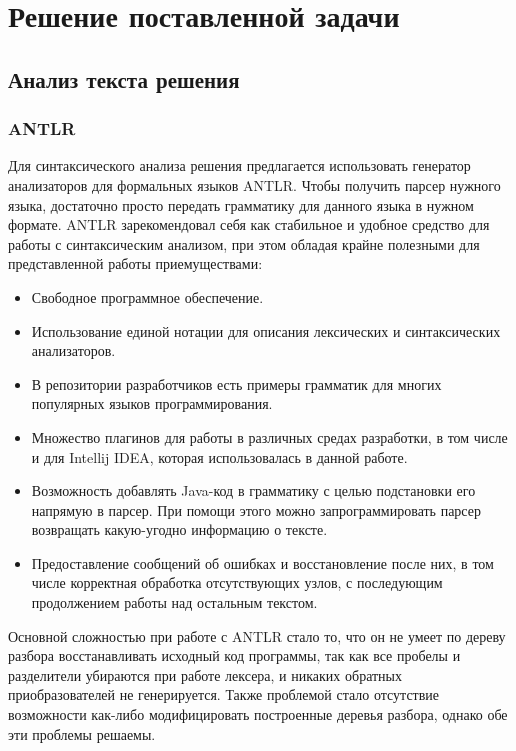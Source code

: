 \chapter{Решение поставленной задачи}

\section{Анализ текста решения}

\subsection{ANTLR}
Для синтаксического анализа решения предлагается использовать генератор анализаторов для формальных языков ANTLR.
Чтобы получить парсер нужного языка, достаточно просто передать грамматику для данного языка в нужном формате.
ANTLR зарекомендовал себя как стабильное и удобное средство для работы с синтаксическим анализом, при этом
обладая крайне полезными для представленной работы приемуществами:
\begin{itemize}
    \item Свободное программное обеспечение.
    \item Использование единой нотации для описания лексических и синтаксических анализаторов.
    \item В репозитории разработчиков есть примеры грамматик для многих популярных языков программирования.
    \item Множество плагинов для работы в различных средах разработки, в том числе и для Intellij IDEA, которая
        использовалась в данной работе.
    \item Возможность добавлять Java-код в грамматику с целью подстановки его напрямую в парсер. При помощи этого 
        можно запрограммировать парсер возвращать какую-угодно информацию о тексте.
    \item Предоставление сообщений об ошибках и восстановление после них, в том числе корректная обработка отсутствующих узлов, 
        с последующим продолжением работы над остальным текстом. 
\end{itemize} 

Основной сложностью при работе с ANTLR стало то, что он не умеет по дереву разбора восстанавливать исходный код программы, так
как все пробелы и разделители убираются при работе лексера, и никаких обратных приобразователей не генерируется. Также проблемой
стало отсутствие возможности как-либо модифицировать построенные деревья разбора, однако обе эти проблемы решаемы.


